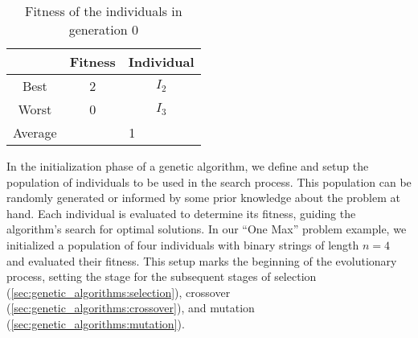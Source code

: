   \begin{table}[H]
    \label{tab:genetic_algorithms:initialization:population_fitness}
    \centering
    \begin{tabular}{|c|c|c|}
      \hline
      & \textbf{Fitness} & \textbf{Individual}  \\
      \hline
      Best & 2 & \(I_2\) \\
      Worst & 0 & \(I_3\) \\
      \hline
      \hline
      Average & \multicolumn{2}{c|}{1} \\
      \hline
    \end{tabular}
    \caption{Fitness of the individuals in generation 0}
  \end{table}
  
  In the initialization phase of a genetic algorithm, we define and setup the population of 
  individuals to be used in the search process. 
  This population can be randomly generated or informed by some prior knowledge about the problem at 
  hand. 
  Each individual is evaluated to determine its fitness, guiding the algorithm's search for optimal 
  solutions. 
  In our \enquote{One Max} problem example, we initialized a population of four individuals with 
  binary strings of length \(n = 4\) and evaluated their fitness. 
  This setup marks the beginning of the evolutionary process, setting the stage for the subsequent 
  stages of selection (\vref{sec:genetic_algorithms:selection}), 
  crossover (\vref{sec:genetic_algorithms:crossover}), and 
  mutation (\vref{sec:genetic_algorithms:mutation}).
